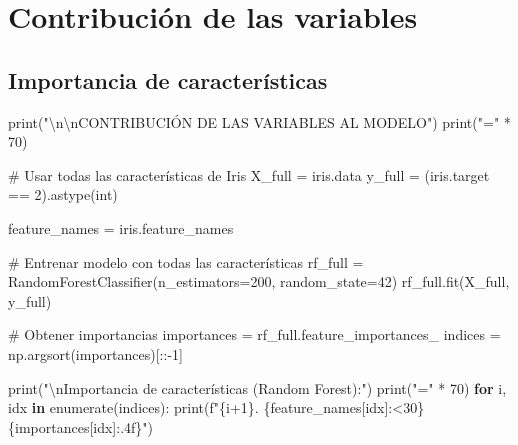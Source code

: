 \documentclass[
  doc,
  floatsintext,
  longtable,
  a4paper,
  nolmodern,
  notxfonts,
  notimes,
  12pt,
  colorlinks=true,linkcolor=blue,citecolor=blue,urlcolor=blue]{apa7}
\newenvironment{Shaded}{\begin{snugshade}}{\end{snugshade}}
\newcommand{\BuiltInTok}[1]{\textcolor[rgb]{0.00,0.23,0.31}{#1}}
\newcommand{\CharTok}[1]{\textcolor[rgb]{0.13,0.47,0.30}{#1}}
\newcommand{\CommentTok}[1]{\textcolor[rgb]{0.37,0.37,0.37}{#1}}
\newcommand{\ControlFlowTok}[1]{\textcolor[rgb]{0.00,0.23,0.31}{\textbf{#1}}}
\newcommand{\DecValTok}[1]{\textcolor[rgb]{0.68,0.00,0.00}{#1}}
\newcommand{\KeywordTok}[1]{\textcolor[rgb]{0.00,0.23,0.31}{\textbf{#1}}}
\newcommand{\NormalTok}[1]{\textcolor[rgb]{0.00,0.23,0.31}{#1}}
\newcommand{\OperatorTok}[1]{\textcolor[rgb]{0.37,0.37,0.37}{#1}}
\newcommand{\SpecialCharTok}[1]{\textcolor[rgb]{0.37,0.37,0.37}{#1}}
\newcommand{\SpecialStringTok}[1]{\textcolor[rgb]{0.13,0.47,0.30}{#1}}
\newcommand{\StringTok}[1]{\textcolor[rgb]{0.13,0.47,0.30}{#1}}
\begin{document}
\section{Contribución de las
variables}\label{contribuciuxf3n-de-las-variables}

\subsection{Importancia de
características}\label{importancia-de-caracteruxedsticas}

\begin{Shaded}
\begin{Highlighting}[]
\BuiltInTok{print}\NormalTok{(}\StringTok{"}\CharTok{\textbackslash{}n\textbackslash{}n}\StringTok{CONTRIBUCIÓN DE LAS VARIABLES AL MODELO"}\NormalTok{)}
\BuiltInTok{print}\NormalTok{(}\StringTok{"="} \OperatorTok{*} \DecValTok{70}\NormalTok{)}

\CommentTok{\# Usar todas las características de Iris}
\NormalTok{X\_full }\OperatorTok{=}\NormalTok{ iris.data}
\NormalTok{y\_full }\OperatorTok{=}\NormalTok{ (iris.target }\OperatorTok{==} \DecValTok{2}\NormalTok{).astype(}\BuiltInTok{int}\NormalTok{)}

\NormalTok{feature\_names }\OperatorTok{=}\NormalTok{ iris.feature\_names}

\CommentTok{\# Entrenar modelo con todas las características}
\NormalTok{rf\_full }\OperatorTok{=}\NormalTok{ RandomForestClassifier(n\_estimators}\OperatorTok{=}\DecValTok{200}\NormalTok{, random\_state}\OperatorTok{=}\DecValTok{42}\NormalTok{)}
\NormalTok{rf\_full.fit(X\_full, y\_full)}

\CommentTok{\# Obtener importancias}
\NormalTok{importances }\OperatorTok{=}\NormalTok{ rf\_full.feature\_importances\_}
\NormalTok{indices }\OperatorTok{=}\NormalTok{ np.argsort(importances)[::}\OperatorTok{{-}}\DecValTok{1}\NormalTok{]}

\BuiltInTok{print}\NormalTok{(}\StringTok{"}\CharTok{\textbackslash{}n}\StringTok{Importancia de características (Random Forest):"}\NormalTok{)}
\BuiltInTok{print}\NormalTok{(}\StringTok{"="} \OperatorTok{*} \DecValTok{70}\NormalTok{)}
\ControlFlowTok{for}\NormalTok{ i, idx }\KeywordTok{in} \BuiltInTok{enumerate}\NormalTok{(indices):}
    \BuiltInTok{print}\NormalTok{(}\SpecialStringTok{f"}\SpecialCharTok{\{}\NormalTok{i}\OperatorTok{+}\DecValTok{1}\SpecialCharTok{\}}\SpecialStringTok{. }\SpecialCharTok{\{}\NormalTok{feature\_names[idx]}\SpecialCharTok{:\textless{}30\}}\SpecialStringTok{ }\SpecialCharTok{\{}\NormalTok{importances[idx]}\SpecialCharTok{:.4f\}}\SpecialStringTok{"}\NormalTok{)}
\end{Highlighting}
\end{Shaded}
\end{document}
